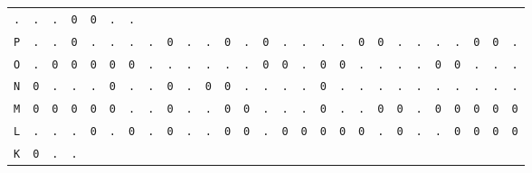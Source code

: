 \begin{figure}[H]
\begin{center}
{\begin{tabular}{c|cccccccccccccccccccccccccc}
        \texttt{.} & \texttt{.} & \texttt{.} & \texttt{0} &
        \texttt{0} & \texttt{.} & \texttt{.}                             \\
        \texttt{P} & \texttt{.} & \texttt{.} & \texttt{0} &
        \texttt{.} & \texttt{.} & \texttt{.} & \texttt{.} &
        \texttt{0} & \texttt{.} & \texttt{.} & \texttt{0} &
        \texttt{.} & \texttt{0} & \texttt{.} & \texttt{.} &
        \texttt{.} & \texttt{.} & \texttt{0} & \texttt{0} &
        \texttt{.} & \texttt{.} & \texttt{.} & \texttt{.} &
        \texttt{0} & \texttt{0} & \texttt{.}                             \\
        \texttt{O} & \texttt{.} & \texttt{0} & \texttt{0} &
        \texttt{0} & \texttt{0} & \texttt{0} & \texttt{.} &
        \texttt{.} & \texttt{.} & \texttt{.} & \texttt{.} &
        \texttt{.} & \texttt{0} & \texttt{0} & \texttt{.} &
        \texttt{0} & \texttt{0} & \texttt{.} & \texttt{.} &
        \texttt{.} & \texttt{.} & \texttt{0} & \texttt{0} &
        \texttt{.} & \texttt{.} & \texttt{.}                             \\
        \texttt{N} & \texttt{0} & \texttt{.} & \texttt{.} &
        \texttt{.} & \texttt{0} & \texttt{.} & \texttt{.} &
        \texttt{0} & \texttt{.} & \texttt{0} & \texttt{0} &
        \texttt{.} & \texttt{.} & \texttt{.} & \texttt{.} &
        \texttt{0} & \texttt{.} & \texttt{.} & \texttt{.} &
        \texttt{.} & \texttt{.} & \texttt{.} & \texttt{.} &
        \texttt{.} & \texttt{.} & \texttt{.}                             \\
        \texttt{M} & \texttt{0} & \texttt{0} & \texttt{0} &
        \texttt{0} & \texttt{0} & \texttt{.} & \texttt{.} &
        \texttt{0} & \texttt{.} & \texttt{.} & \texttt{0} &
        \texttt{0} & \texttt{.} & \texttt{.} & \texttt{.} &
        \texttt{0} & \texttt{.} & \texttt{.} & \texttt{0} &
        \texttt{0} & \texttt{.} & \texttt{0} & \texttt{0} &
        \texttt{0} & \texttt{0} & \texttt{0}                             \\
        \texttt{L} & \texttt{.} & \texttt{.} & \texttt{.} &
        \texttt{0} & \texttt{.} & \texttt{0} & \texttt{.} &
        \texttt{0} & \texttt{.} & \texttt{.} & \texttt{0} &
        \texttt{0} & \texttt{.} & \texttt{0} & \texttt{0} &
        \texttt{0} & \texttt{0} & \texttt{0} & \texttt{.} &
        \texttt{0} & \texttt{.} & \texttt{.} & \texttt{0} &
        \texttt{0} & \texttt{0} & \texttt{0}                             \\
        \texttt{K} & \texttt{0} & \texttt{.} & \texttt{.} &

\end{tabular}}
\end{center}
\end{figure}
